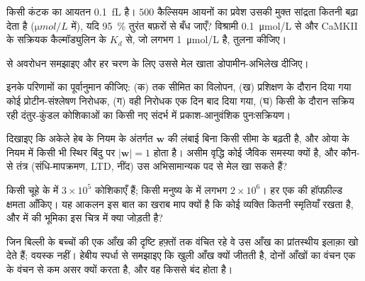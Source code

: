 \begin{exercise}[$\star\star$]\label{exo:b3:learning-memory:7}
किसी कंटक का आयतन \qty{0.1}{fL} है। $500$ कैल्सियम आयनों का प्रवेश
उसकी मुक्त सांद्रता कितनी बढ़ा देता है ($\unit{\micro mol/L}$ में),
यदि \qty{95}{\%} तुरंत बफ़रों से बँध जाएँ? विश्रामी
\qty{0.1}{\micro mol/L} से और CaMKII के सक्रियक कैल्मॉड्युलिन के
$K_{d}$ से, जो लगभग \qty{1}{\micro mol/L} है, तुलना कीजिए।
\end{exercise}

\begin{exercise}[$\star\star$]\label{exo:b3:learning-memory:8}
 से अवरोधन समझाइए और हर चरण के लिए उससे मेल खाता
डोपामीन-अभिलेख दीजिए।
\end{exercise}

\begin{exercise}[$\star\star$]\label{exo:b3:learning-memory:9}
इनके परिणामों का पूर्वानुमान कीजिए: (क)  तक सीमित  का
विलोपन, (ख) प्रशिक्षण के दौरान दिया गया कोई प्रोटीन-संश्लेषण निरोधक,
(ग) वही निरोधक एक दिन बाद दिया गया, (घ) किसी  के दौरान सक्रिय
रही दंतुर-कुंडल कोशिकाओं का किसी नए संदर्भ में प्रकाश-आनुवंशिक
पुनःसक्रियण।
\end{exercise}

\begin{exercise}[$\star\star\star$]\label{exo:b3:learning-memory:10}
दिखाइए कि अकेले हेब के नियम के अंतर्गत $\mathbf{w}$ की लंबाई बिना किसी
सीमा के बढ़ती है, और ओया के नियम में किसी भी स्थिर बिंदु पर
$|\mathbf{w}| = 1$ होता है। असीम वृद्धि कोई जैविक समस्या क्यों है, और
कौन-से तंत्र (संधि-मापक्रमण, LTD, नींद) उस अभिसामान्यक पद से मेल खा
सकते हैं?
\end{exercise}

\begin{exercise}[$\star\star\star$]\label{exo:b3:learning-memory:11}
किसी चूहे के  में $3\times 10^{5}$ कोशिकाएँ हैं; किसी मनुष्य के में
लगभग $2\times 10^{6}$। हर एक की हॉपफ़ील्ड क्षमता आँकिए। यह आकलन इस बात
का खराब माप क्यों है कि कोई व्यक्ति कितनी स्मृतियाँ रखता है, और
 में  की भूमिका इस चित्र में क्या जोड़ती है?
\end{exercise}

\begin{exercise}[$\star\star\star$]\label{exo:b3:learning-memory:12}
जिन बिल्ली के बच्चों की एक आँख की दृष्टि हफ़्तों तक वंचित रहे वे उस
आँख का प्रांतस्थीय इलाक़ा खो देते हैं; वयस्क नहीं। हेबीय स्पर्धा से
समझाइए कि खुली आँख क्यों जीतती है, दोनों आँखों का वंचन एक के वंचन से
कम असर क्यों करता है, और वह  किससे बंद होता है।
\end{exercise}

